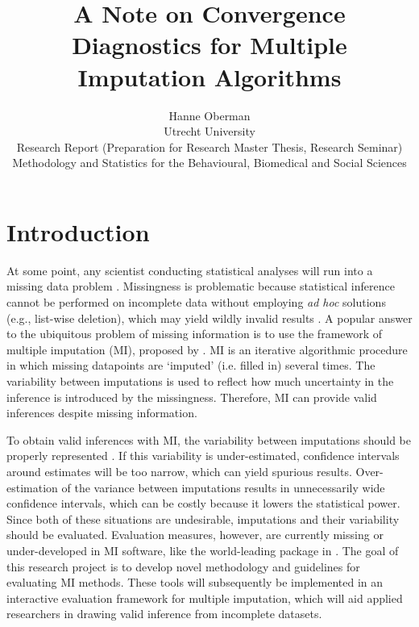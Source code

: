 \documentclass[article]{jss}
\author{Hanne Oberman\\Utrecht University \AND \\ Research Report (Preparation for Research Master Thesis, Research Seminar) \\ Methodology and Statistics for the Behavioural, Biomedical and Social Sciences}
\title{A Note on Convergence Diagnostics for Multiple Imputation Algorithms}
\begin{document}

\section{Introduction} \label{sec:intro} %

At some point, any scientist conducting statistical analyses will run into a missing data problem \citep{alli02}. Missingness is problematic because statistical inference cannot be performed on incomplete data without employing \emph{ad hoc} solutions (e.g., list-wise deletion), which may yield wildly invalid results \citep{buur18}. A popular answer to the ubiquitous problem of missing information is to use the framework of multiple imputation (MI), proposed by \cite{rubin87}. MI is an iterative algorithmic procedure in which missing datapoints are `imputed' (i.e. filled in) several times. The variability between imputations is used to reflect how much uncertainty in the inference is introduced by the missingness. Therefore, MI can provide valid inferences despite missing information. 

To obtain valid inferences with MI, the variability between imputations should be properly represented \citep{rubin87, buur18}. If this variability is under-estimated, confidence intervals around estimates will be too narrow, which can yield spurious results. Over-estimation of the variance between imputations results in unnecessarily wide confidence intervals, which can be costly because it lowers the statistical power. Since both of these situations are undesirable, imputations and their variability should be evaluated. Evaluation measures, however, are currently missing or under-developed in MI software, like the world-leading  package \citep{mice} in  \citep{R}. %
The goal of this research project is to develop novel methodology and guidelines for evaluating MI methods. These tools will subsequently be implemented in an interactive evaluation framework for multiple imputation, which will aid applied researchers in drawing valid inference from incomplete datasets. 
\end{document}
